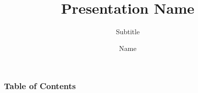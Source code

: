 \documentclass[12pt]{beamer}
\title[] %
{Presentation Name}
\subtitle{Subtitle}
\author[Name] %
{Name}
\institute[Intitute] %
{
  Institute
}
\date[Semester] %
{}
\begin{document}
\maketitle
\frametitle{Table of Contents}
\tableofcontents

\end{document}
